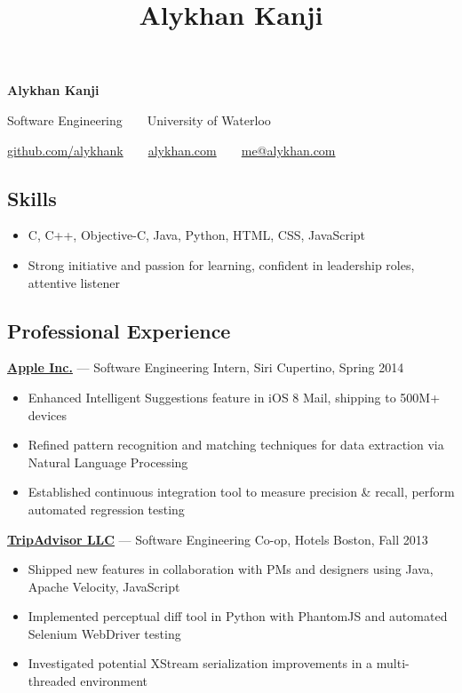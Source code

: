 \documentclass[letterpaper]{article}
\title{Alykhan Kanji}
\begin{document}
\begin{center}
{\Huge \textbf{Alykhan Kanji}}

{\large
Software Engineering\ \ \textbullet \ \ University of Waterloo

\href{https://github.com/alykhank}{github.com/alykhank}\ \ \textbullet \ \ \href{http://alykhan.com}{alykhan.com}\ \ \textbullet \ \ \href{mailto:me@alykhan.com}{me@alykhan.com}
}
\end{center}

\subsection*{Skills}

\begin{itemize}[leftmargin=1pc]
\itemsep0em
\item C, C++, Objective-C, Java, Python, HTML, CSS, JavaScript
\item Strong initiative and passion for learning, confident in leadership roles, attentive listener
\end{itemize}


\subsection*{Professional Experience}

\noindent
\href{http://apple.com}{\textbf{Apple Inc.}} --- Software Engineering Intern, Siri \hfill {\color{gray} Cupertino, Spring 2014}

\begin{itemize}[leftmargin=1pc]
\itemsep0em
\item Enhanced Intelligent Suggestions feature in iOS 8 Mail, shipping to 500M+ devices
\item Refined pattern recognition and matching techniques for data extraction via Natural Language Processing
\item Established continuous integration tool to measure precision \& recall, perform automated regression testing
\end{itemize}

\noindent
\href{http://tripadvisor.com}{\textbf{TripAdvisor LLC}} --- Software Engineering Co-op, Hotels \hfill {\color{gray} Boston, Fall 2013}

\begin{itemize}[leftmargin=1pc]
\itemsep0em
\item Shipped new features in collaboration with PMs and designers using Java, Apache Velocity, JavaScript
\item Implemented perceptual diff tool in Python with PhantomJS and automated Selenium WebDriver testing
\item Investigated potential XStream serialization improvements in a multi-threaded environment
\end{itemize}
\end{document}
